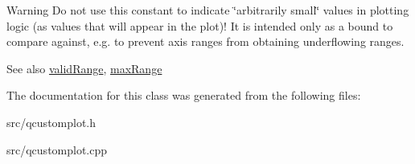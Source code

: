 \begin{DoxyWarning}{Warning}
Do not use this constant to indicate \char`\"{}arbitrarily small\char`\"{} values in plotting logic (as values that will appear in the plot)! It is intended only as a bound to compare against, e.\+g. to prevent axis ranges from obtaining underflowing ranges.
\end{DoxyWarning}
\begin{DoxySeeAlso}{See also}
\hyperlink{classQCPRange_ab38bd4841c77c7bb86c9eea0f142dcc0}{valid\+Range}, \hyperlink{classQCPRange_a5ca51e7a2dc5dc0d49527ab171fe1f4f}{max\+Range} 
\end{DoxySeeAlso}


The documentation for this class was generated from the following files\+:\begin{DoxyCompactItemize}
\item 
src/qcustomplot.\+h\item 
src/qcustomplot.\+cpp\end{DoxyCompactItemize}

